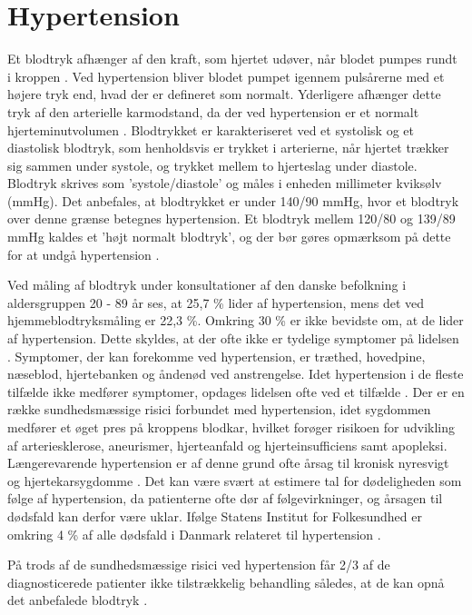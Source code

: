 \section{Hypertension} \label{sec:hypertension}

Et blodtryk afhænger af den kraft, som hjertet udøver, når blodet pumpes rundt i kroppen \citep{martini2015}. Ved hypertension bliver blodet pumpet igennem pulsårerne med et højere tryk end, hvad der er defineret som normalt. Yderligere afhænger dette tryk af den arterielle karmodstand, da der ved hypertension er et normalt hjerteminutvolumen \citep{olsen2015}. 
Blodtrykket er karakteriseret ved et systolisk og et diastolisk blodtryk, som henholdsvis er trykket i arterierne, når hjertet trækker sig sammen under systole, og trykket mellem to hjerteslag under diastole. Blodtryk skrives som 'systole/diastole' og måles i enheden millimeter kviksølv (mmHg). Det anbefales, at blodtrykket er under 140/90 mmHg, hvor et blodtryk over denne grænse betegnes hypertension. Et blodtryk mellem 120/80 og 139/89 mmHg kaldes et 'højt normalt blodtryk', og der bør gøres opmærksom på dette for at undgå hypertension \cite{martini2015}.
  
Ved måling af blodtryk under konsultationer af den danske befolkning i aldersgruppen 20 - 89 år ses, at 25,7 \% lider af hypertension, mens det ved hjemmeblodtryksmåling er 22,3 \%. Omkring 30 \% er ikke bevidste om, at de lider af hypertension. Dette skyldes, at der ofte ikke er tydelige symptomer på lidelsen \cite{kronborg2008}. Symptomer, der kan forekomme ved hypertension, er træthed, hovedpine, næseblod, hjertebanken og åndenød ved anstrengelse. Idet hypertension i de fleste tilfælde ikke medfører symptomer, opdages lidelsen ofte ved et tilfælde \cite{olsen2015}.
Der er en række sundhedsmæssige risici forbundet med hypertension, idet sygdommen medfører et øget pres på kroppens blodkar, hvilket forøger risikoen for udvikling af arteriesklerose, aneurismer, hjerteanfald og hjerteinsufficiens samt apopleksi. Længerevarende hypertension er af denne grund ofte årsag til kronisk nyresvigt og hjertekarsygdomme \cite{martini2015}. Det kan være svært at estimere tal for dødeligheden som følge af hypertension, da patienterne ofte dør af følgevirkninger, og årsagen til dødsfald kan derfor være uklar. Ifølge Statens Institut for Folkesundhed er omkring 4 \% af alle dødsfald i Danmark relateret til hypertension \cite{juel2006}.
 
På trods af de sundhedsmæssige risici ved hypertension får 2/3 af de diagnosticerede patienter ikke tilstrækkelig behandling således, at de kan opnå det anbefalede blodtryk \cite{paulsen2012}.

